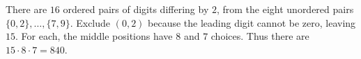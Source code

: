 There are $ 16 $ ordered pairs of digits differing by $ 2 $, from the eight unordered pairs $\{0,2\},\ldots,\{7,9\}$. Exclude $(0,2)$ because the leading digit cannot be zero, leaving $ 15 $. For each, the middle positions have $ 8 $ and $ 7 $ choices. Thus there are $ 15\cdot8\cdot7=\boxed{840}$.
